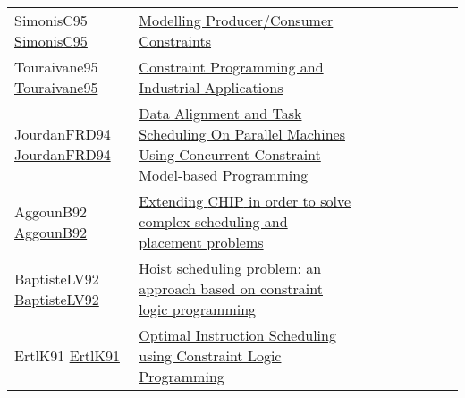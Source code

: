 {\begin{longtable}{p{3cm}p{7cm}lllllll}
SimonisC95 \href{https://doi.org/10.1007/3-540-60299-2\_27}{SimonisC95} &  \href{papers/SimonisC95.pdf}{Modelling Producer/Consumer Constraints} &  &  &  &  &  &  & \\
Touraivane95 \href{https://doi.org/10.1007/3-540-60299-2\_41}{Touraivane95} &  \href{papers/Touraivane95.pdf}{Constraint Programming and Industrial Applications} &  &  &  &  &  &  & \\
JourdanFRD94 \href{}{JourdanFRD94} &  \href{}{Data Alignment and Task Scheduling On Parallel Machines Using Concurrent Constraint Model-based Programming} &  &  &  &  &  &  & \\
AggounB92 \href{}{AggounB92} &  \href{}{Extending {CHIP} in order to solve complex scheduling and placement problems} &  &  &  &  &  &  & \\
BaptisteLV92 \href{https://doi.org/10.1109/ROBOT.1992.220195}{BaptisteLV92} &  \href{papers/BaptisteLV92.pdf}{Hoist scheduling problem: an approach based on constraint logic programming} &  &  &  &  &  &  & \\
ErtlK91 \href{https://doi.org/10.1007/3-540-54444-5\_89}{ErtlK91} &  \href{papers/ErtlK91.pdf}{Optimal Instruction Scheduling using Constraint Logic Programming} &  &  &  &  &  &  & \\
\end{longtable}
}

